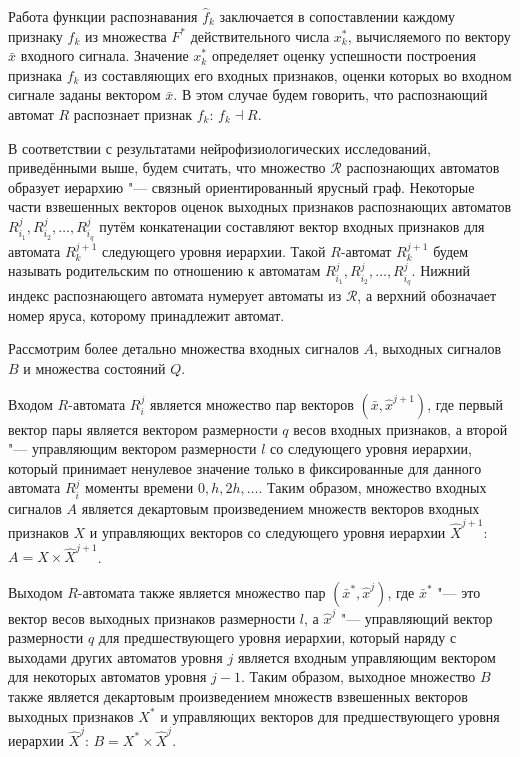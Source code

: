 \documentclass[a4paper, 12pt]{article}
\theoremstyle{plain}
\begin{document}
	Работа функции распознавания $\hat f_k$ заключается в сопоставлении каждому признаку $f_k$ из множества $F^*$ действительного числа $x_k^*$, вычисляемого по вектору $\bar x$ входного сигнала. Значение $x_k^*$ определяет оценку успешности построения признака $f_k$ из составляющих его входных признаков, оценки которых во входном сигнале заданы вектором $\bar x$. В этом случае будем говорить, что распознающий автомат $R$ распознает признак $f_k$: $f_k\dashv R$.
	
	В соответствии с результатами нейрофизиологических исследований, приведёнными выше, будем считать, что множество  $\mathcal R$ распознающих автоматов образует иерархию "--- связный ориентированный ярусный граф. Некоторые части взвешенных векторов оценок выходных признаков распознающих автоматов $R_{i_1}^j,R_{i_2}^j,\dots,R_{i_q}^j$ путём конкатенации составляют вектор входных признаков для  автомата $R_k^{j+1}$ следующего уровня иерархии. Такой $R$-автомат $R_k^{j+1}$ будем называть родительским по отношению к автоматам $R_{i_1}^j,R_{i_2}^j,\dots,R_{i_q}^j$. Нижний индекс распознающего автомата нумерует автоматы из $\mathcal R$, а верхний обозначает номер яруса, которому принадлежит автомат.
		
	Рассмотрим более детально множества входных сигналов $A$, выходных сигналов $B$ и множества состояний $Q$.
	
	Входом $R$-автомата $R_i^j$ является множество пар векторов $(\bar x,\hat x^{j+1})$, где первый вектор пары является вектором размерности $q$ весов входных признаков, а второй "--- управляющим вектором размерности $l$ со следующего уровня иерархии, который принимает ненулевое значение только в фиксированные для данного автомата $R_i^j$ моменты времени $0,h,2h,\dots$. Таким образом, множество входных сигналов $A$ является декартовым произведением множеств векторов входных признаков $X$ и управляющих векторов со следующего уровня иерархии $\hat X^{j+1}$: $A=X\times \hat X^{j+1}$. 
	
	Выходом $R$-автомата также является множество пар $(\bar x^*,\hat x^j)$, где $\bar x^*$ "--- это вектор весов выходных признаков размерности $l$, а $\hat x^j$ "--- управляющий вектор размерности $q$ для предшествующего уровня иерархии, который наряду с выходами других автоматов уровня $j$ является входным управляющим вектором для некоторых автоматов уровня $j-1$. Таким образом, выходное множество $B$ также является декартовым произведением множеств взвешенных векторов выходных признаков $X^*$ и управляющих векторов для предшествующего уровня иерархии $\hat X^j$: $B=X^*\times \hat X^j$.
	
\end{document}
